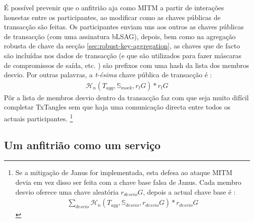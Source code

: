 \begin{enumerate}
É possível prevenir que o anfitrião aja como MITM a partir de interações honestas entre os participantes, ao modificar como as chaves públicas de transacção são feitas. 
Os participantes enviam uns aos outros as chaves públicas de transacção (com uma assinatura bLSAG), depois, bem como na agregação robusta de chave da secção \ref{sec:robust-key-aggregation}, as chaves que de facto são incluídas nos dados de transacção (e que são utilizados para fazer máscaras de compromissos de saída, etc. ) são prefixos com uma hash da lista dos membros desvio. Por outras palavras, a {\em t-ésima} chave pública de transacção é :
\begin{align*}
\mathcal{H}_n(T_{agg},\mathbb{S}_{mock},r_t G)*r_t G
\end{align*}
Pôr a lista de membros desvio dentro da transacção faz com que seja muito difícil completar TxTangles sem que haja uma comunicação directa entre todos os actuais participantes. 
\footnote{Se a mitigação de Janus for implementada, esta defesa ao ataque MITM devia em vez disso ser feita com a chave base falsa de Janus. Cada membro desvio oferece uma chave aleatória $r_{desvio} G$, depois a actual chave base é :
\begin{align*}
\sum_{desvio} \mathcal{H}_n(T_{agg},\mathbb{S}_{desvio},r_{desvio} G)*r_{desvio} G
\end{align*}
}
\end{enumerate}{}


\subsection{Um anfitrião como um serviço}

